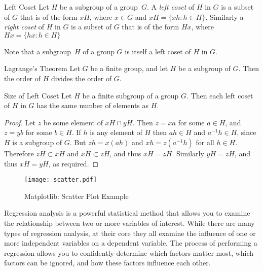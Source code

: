 \documentclass{elegantbook}
\begin{document}
\begin{definition}{Left Coset}{}
Let $H$ be a subgroup of a group~$G$.  A \emph{left coset} of $H$ in $G$ is a subset of $G$ that is of the form $xH$, where $x \in G$ and $xH = \{ xh : h \in H \}$. Similarly a \emph{right coset} of $H$ in $G$ is a subset of $G$ that is of the form $Hx$, where $Hx = \{ hx : h \in H \}$
\end{definition}

\begin{note}
Note that a subgroup~$H$ of a group $G$ is itself a left coset of $H$ in $G$.
\end{note}

\lipsum[2]

\begin{theorem}{Lagrange's Theorem}{}
Let $G$ be a finite group, and let $H$ be a subgroup of $G$.  Then the order of $H$ divides the order of $G$.
\end{theorem}

\lipsum[3]

   
\begin{proposition}{Size of Left Coset}{}
Let $H$ be a finite subgroup of a group $G$.  Then each left coset of $H$ in $G$ has the same number of elements as $H$.
\end{proposition}

\begin{proof}
Let $z$ be some element of $xH \cap yH$.  Then $z = xa$ for some $a \in H$, and $z = yb$ for some $b \in H$. If $h$ is any element of $H$ then $ah \in H$ and $a^{-1}h \in H$, since $H$ is a subgroup of $G$. But $zh = x(ah)$ and $xh = z(a^{-1}h)$ for all $h \in H$. Therefore $zH \subset xH$ and $xH \subset zH$, and thus $xH = zH$.  Similarly $yH = zH$, and thus $xH = yH$, as required.
\end{proof}

\begin{figure}[htbp]
	\centering
	\texttt{[image: scatter.pdf]}
	\caption{Matplotlib: Scatter Plot Example\label{fig:scatter}}
\end{figure}

Regression analysis is a powerful statistical method that allows you to examine the relationship between two or more variables of interest. While there are many types of regression analysis, at their core they all examine the influence of one or more independent variables on a dependent variable. The process of performing a regression allows you to confidently determine which factors matter most, which factors can be ignored, and how these factors influence each other.
\end{document}
